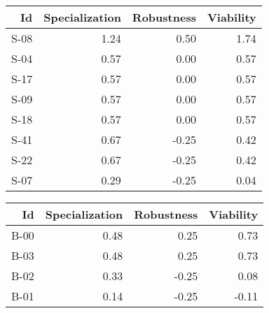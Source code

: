 


\begin{tabular}{ | r | r | r | r | }
    \hline
                    Id  &  Specialization  &      Robustness  &       Viability  \\
    \hline
    \hline
                  S-08  &            1.24  &            0.50  &            1.74  \\
    \hline
                  S-04  &            0.57  &            0.00  &            0.57  \\
    \hline
                  S-17  &            0.57  &            0.00  &            0.57  \\
    \hline
                  S-09  &            0.57  &            0.00  &            0.57  \\
    \hline
                  S-18  &            0.57  &            0.00  &            0.57  \\
    \hline
                  S-41  &            0.67  &           -0.25  &            0.42  \\
    \hline
                  S-22  &            0.67  &           -0.25  &            0.42  \\
    \hline
                  S-07  &            0.29  &           -0.25  &            0.04  \\
    \hline
\end{tabular}


\begin{tabular}{ | r | r | r | r | }
    \hline
                    Id  &  Specialization  &      Robustness  &       Viability  \\
    \hline
    \hline
                  B-00  &            0.48  &            0.25  &            0.73  \\
    \hline
                  B-03  &            0.48  &            0.25  &            0.73  \\
    \hline
                  B-02  &            0.33  &           -0.25  &            0.08  \\
    \hline
                  B-01  &            0.14  &           -0.25  &           -0.11  \\
    \hline
\end{tabular}


